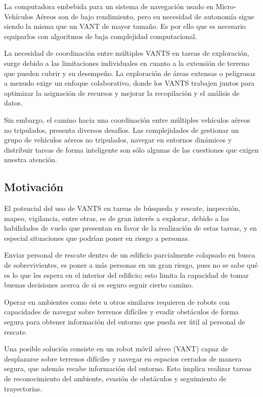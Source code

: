 La computadora embebida para un sistema de navegación usado en Micro-Vehículos Aéreos son de bajo rendimiento, pero su necesidad de autonomía sigue siendo la misma que un VANT de mayor tamaño. Es por ello que es necesario equiparlos con algoritmos de baja complejidad computacional.

La necesidad de coordinación entre múltiples VANTS en tareas de exploración, surge debido a las limitaciones individuales en cuanto a la extensión de terreno que pueden cubrir y su desempeño. La exploración de áreas extensas o peligrosas a menudo exige un enfoque colaborativo, donde los VANTS trabajen juntos para optimizar la asignación de recursos y mejorar la recopilación y el análisis de datos.

Sin embargo, el camino hacia una coordinación entre múltiples vehículos aéreos no tripulados, presenta diversos desafíos. Las complejidades de gestionar un grupo de vehículos aéreos no tripulados, navegar en entornos dinámicos y distribuir tareas de forma inteligente son sólo algunas de las cuestiones que exigen nuestra atención. %

\subsection*{Motivación}

El potencial del uso de VANTS en tareas de búsqueda y rescate, inspección, mapeo, vigilancia, entre otras, es de gran interés a explorar, debido a las habilidades de vuelo que presentan en favor de la realización de estas tareas, y en especial situaciones que podrían poner en riesgo a personas.

Enviar personal de rescate dentro de un edificio parcialmente colapsado en busca de sobrevivientes, es poner a más personas en un gran riesgo, pues no se sabe qué es lo que les espera en el interior del edificio; esto limita la capacidad de tomar buenas decisiones acerca de si es seguro seguir cierto camino.

Operar en ambientes como éste u otros similares requieren de robots con capacidades de navegar sobre terrenos difíciles y evadir obstáculos de forma segura para obtener información del entorno que pueda ser útil al personal de rescate.

Una posible solución consiste en un robot móvil aéreo (VANT) capaz de desplazarse sobre terrenos difíciles y navegar en espacios cerrados de manera segura, que además recabe información del entorno. Esto implica realizar tareas de reconocimiento del ambiente, evasión de obstáculos y seguimiento de trayectorias.

